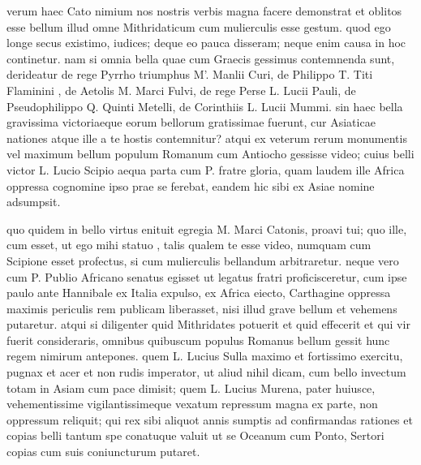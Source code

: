  verum haec Cato nimium nos nostris verbis magna facere demonstrat et oblitos esse bellum illud omne Mithridaticum cum mulierculis esse gestum. quod ego longe secus existimo, iudices; deque eo pauca disseram; neque enim causa in hoc continetur. nam si omnia bella quae cum Graecis gessimus contemnenda sunt, derideatur de rege Pyrrho triumphus M'. Manlii Curi, de Philippo T. Titi Flaminini , de Aetolis M. Marci Fulvi, de rege Perse L. Lucii Pauli, de Pseudophilippo Q. Quinti Metelli, de Corinthiis L. Lucii Mummi. sin haec bella gravissima victoriaeque eorum bellorum gratissimae fuerunt, cur Asiaticae nationes atque ille a te hostis contemnitur? atqui ex veterum rerum monumentis vel maximum bellum populum Romanum cum Antiocho gessisse video; cuius belli victor L. Lucio Scipio aequa parta cum P. fratre gloria, quam laudem ille Africa oppressa cognomine ipso prae se ferebat, eandem hic sibi ex Asiae nomine adsumpsit.

 quo quidem in bello virtus enituit egregia M. Marci Catonis, proavi tui; quo ille, cum esset, ut ego mihi statuo , talis qualem te esse video, numquam cum Scipione esset profectus, si cum mulierculis bellandum arbitraretur. neque vero cum P. Publio Africano senatus egisset ut legatus fratri proficisceretur, cum ipse paulo ante Hannibale ex Italia expulso, ex Africa eiecto, Carthagine oppressa maximis periculis rem publicam liberasset, nisi illud grave bellum et vehemens putaretur. atqui si diligenter quid Mithridates potuerit et quid effecerit et qui vir fuerit consideraris, omnibus quibuscum populus Romanus bellum gessit hunc regem nimirum antepones. quem L. Lucius Sulla maximo et fortissimo exercitu, pugnax et acer et non rudis imperator, ut aliud nihil dicam, cum bello invectum totam in Asiam cum pace dimisit; quem L. Lucius Murena, pater huiusce, vehementissime vigilantissimeque vexatum repressum magna ex parte, non oppressum reliquit; qui rex sibi aliquot annis sumptis ad confirmandas rationes et copias belli tantum spe conatuque valuit ut se Oceanum cum Ponto, Sertori copias cum suis coniuncturum putaret.

